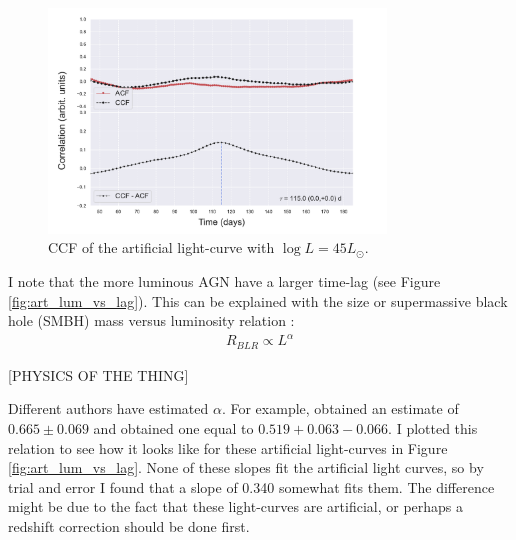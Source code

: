 \documentclass[letterpaper, oneside]{article}
\begin{document}
\begin{figure}[p]
	\centering
	\includegraphics[width=0.8\textwidth]{../CCF_plots/x_y_bands_45_final.pdf}
	\caption{CCF of the artificial light-curve with $\log L = 45 L_{\odot}$.}
	\label{fig:ccf_art_lcs_L45}
\end{figure}

I note that the more luminous AGN have a larger time-lag (see Figure \ref{fig:art_lum_vs_lag}). This can be explained with the size or supermassive black hole (SMBH) mass versus luminosity relation \cite{Kaspi_2007, Bentz_2009}:
\begin{align}
	R_{BLR} \propto L^{\alpha}
\end{align}

[PHYSICS OF THE THING]

Different authors have estimated $\alpha$. For example, \cite{Kaspi_2005} obtained an estimate of $0.665 \pm 0.069$ and \cite{Bentz_2009} obtained one equal to $0.519 + 0.063 - 0.066$. I plotted this relation to see how it looks like for these artificial light-curves in Figure \ref{fig:art_lum_vs_lag}. None of these slopes fit the artificial light curves, so by trial and error I found that a slope of 0.340 somewhat fits them. The difference might be due to the fact that these light-curves are artificial, or perhaps a redshift correction should be done first.
\end{document}
